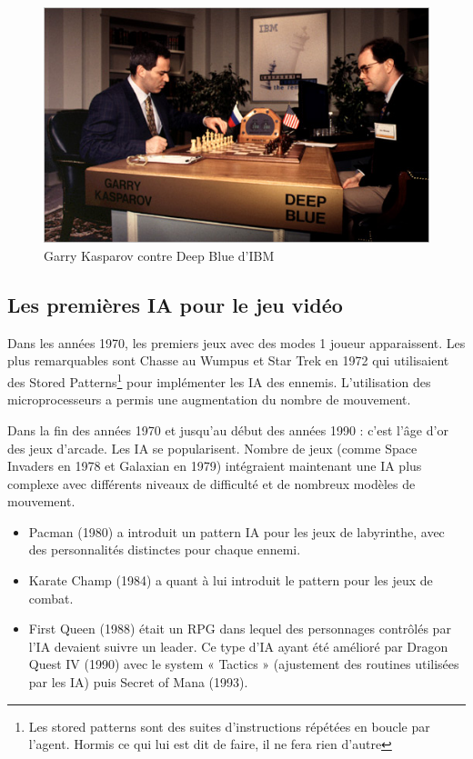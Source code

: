 \documentclass[a4paper, 12pt]{article} %
\begin{document}
\begin{figure}[!h]%
	\begin{center} 
		\includegraphics[width=0.60\columnwidth]{images/DeepBlue.png}%
		\caption{Garry Kasparov contre Deep Blue d'IBM}%
	\end{center}
\end{figure}

\newpage
\subsection{Les premières IA pour le jeu vidéo}
Dans les années 1970, les premiers jeux avec des modes 1 joueur apparaissent. Les plus remarquables sont Chasse au Wumpus et Star Trek en 1972 qui utilisaient des Stored Patterns\footnote{Les stored patterns sont des suites d’instructions répétées en boucle par l’agent. Hormis ce qui lui est dit de faire, il ne fera rien d’autre}  pour implémenter les IA des ennemis. L’utilisation des microprocesseurs a permis une augmentation du nombre de mouvement. 

Dans la fin des années 1970 et jusqu’au début des années 1990 : c’est l’âge d’or des jeux d’arcade. Les IA se popularisent. Nombre de jeux (comme Space Invaders en 1978 et Galaxian en 1979) intégraient maintenant une IA plus complexe avec différents niveaux de difficulté et de nombreux modèles de mouvement. 

\begin{itemize}
	\item Pacman (1980) a introduit un pattern IA pour les jeux de labyrinthe, avec des personnalités distinctes pour chaque ennemi.
	\item Karate Champ (1984) a quant à lui introduit le pattern pour les jeux de combat.
	\item First Queen (1988) était un RPG dans lequel des personnages contrôlés par l’IA devaient suivre un leader. Ce type d’IA ayant été amélioré par Dragon Quest IV (1990) avec le system « Tactics » (ajustement des routines utilisées par les IA) puis Secret of Mana (1993).
\end{itemize}
\end{document}
